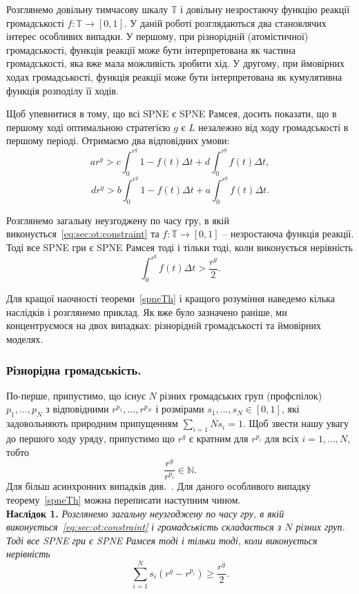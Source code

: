 Розглянемо довільну тимчасову шкалу $\mathbb{T}$ і довільну незростаючу функцію реакції громадськості $f : \mathbb{T} \to [0,1]$. У даній роботі розглядаються два становлячих інтерес особливих випадки. У першому, при різноріднiй (атомістичної) громадськості, функція реакції може бути інтерпретована як частина громадськості, яка вже мала можливість зробити хід. У другому, при ймовірних ходах громадськості, функція реакції може бути інтерпретована як кумулятивна функція розподілу її ходів.

Щоб упевнитися в тому, що всі SPNE є SPNE Рамсея, досить показати, що в першому ході оптимальною стратегією $g$ є $L$ незалежно від ходу громадськості в першому періоді. Отримаємо два відповідних умови:
\begin{equation}
\label{sec:hetero:main1}
ar^g > c \int_0^{r^g} 1 - f(t) \Delta t + d  \int_0^{r^g} f(t) \Delta t ,
\end{equation}
\begin{equation}
\label{sec:hetero:main2}
dr^g > b \int_0^{r^g} 1 - f(t) \Delta t + a  \int_0^{r^g} f(t) \Delta t .
\end{equation}

\begin{theorem}
	\label{spneTh}
Розглянемо загальну неузгоджену по часу гру, в якій виконується~\eqref{eq:sec:ot:constraint} та $f : \mathbb{T} \to [0,1]$ -- незростаюча функція реакції. Тоді все SPNE гри є SPNE Рамсея тоді і тільки тоді, коли виконується нерівність
	\begin{equation}
	\label{sec:hetero:main3}
	\int_0^{r^g} f(t) \Delta t > \frac{r^g}{2} .
	\end{equation}
\end{theorem}

Для кращої наочності теореми~\ref{spneTh} і кращого розуміння наведемо кілька наслідків і розглянемо приклад. Як вже було зазначено раніше, ми концентруємося на двох випадках: різноріднiй громадськості та ймовірних моделях.

\subsubsection{Різнорідна громадськість.}
 По-перше, припустимо, що існує $ N $ різних громадських груп (профспілок) $p_1,...,p_N$ з відповідними  $r^{p_1},...,r^{p_N}$ і розмірами $s_1,...,s_N \in [0,1]$, які задовольняють природним припущенням  $\sum_{i=1}{N}s_i = 1$. Щоб звести нашу увагу до першого ходу уряду, припустимо що $r^g$ є кратним для $r^{p_i}$ для всіх $i = 1,...,N$, тобто
$$ \frac{r^g}{r^{p_i}} \in \mathbb{N}.$$
Для більш асинхронних випадків див.~\cite{libichIncorpo}. Для даного особливого випадку теорему~\ref{spneTh} можна переписати наступним чином.\\
\textbf{Наслідок 1.} \textit{Розглянемо загальну неузгоджену по часу гру, в якій виконується~\eqref{eq:sec:ot:constraint} і громадськість складається з $ N $ різних груп. Тоді все SPNE гри є SPNE Рамсея тоді і тільки тоді, коли виконується нерівність
	\begin{equation}
	\label{sec:hetero:main4}
	\sum_{i=1}^N s_i(r^g - r^{p_i}) \geqslant \frac{r^g}{2} .
	\end{equation}
}

